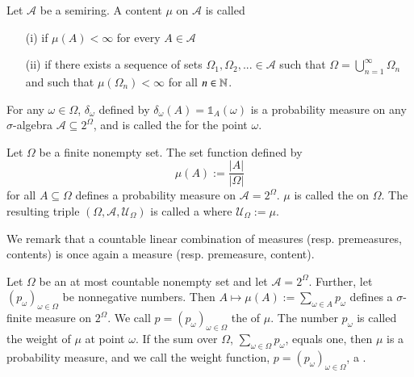 \documentclass[12pt, a4paper, oneside, openright, titlepage]{book}
\begin{document}
\begin{defn}
    Let $\mathcal{A}$ be a semiring. A content $\mu$ on $\mathcal{A}$ is called \begin{itemize}
        \item[(i)]  if $\mu(A) < \infty$ for every $A \in \mathcal{A}$
        \item[(ii)]  if there exists a sequence of sets $\Omega_1,\Omega_2,... \in \mathcal{A}$ such that $\Omega = \bigcup_{n=1}^{\infty}\Omega_n$ and such that $\mu(\Omega_n) < \infty$ for all $n \in \mathbb N$.
    \end{itemize}
\end{defn}

\begin{defn}
    For any $\omega \in \Omega$, $\delta_{\omega}$ defined by $\delta_{\omega}(A) = \mathbb{1}_A(\omega)$ is a probability measure on any $\sigma$-algebra $\mathcal{A} \subseteq 2^{\Omega}$, and is called the  for the point $\omega$.
\end{defn}

\begin{defn}
    Let $\Omega$ be a finite nonempty set. The set function defined by \begin{equation*}
        \mu(A) := \frac{|A|}{|\Omega|}
    \end{equation*}
    for all $A \subseteq \Omega$ defines a probability measure on $\mathcal{A} = 2^{\Omega}$. $\mu$ is called the  on $\Omega$. The resulting triple $(\Omega,\mathcal{A},\mathcal{U}_{\Omega})$ is called a  where $\mathcal{U}_{\Omega} := \mu$.
\end{defn}

We remark that a countable linear combination of measures (resp. premeasures, contents) is once again a measure (resp. premeasure, content). 

\begin{defn}
    Let $\Omega$ be an at most countable nonempty set and let $\mathcal{A} = 2^{\Omega}$. Further, let $(p_{\omega})_{\omega \in \Omega}$ be nonnegative numbers. Then $A\mapsto \mu(A) := \sum_{\omega \in A}p_{\omega}$ defines a $\sigma$-finite measure on $2^{\Omega}$. We call $p = (p_{\omega})_{\omega \in \Omega}$ the  of $\mu$. The number $p_{\omega}$ is called the weight of $\mu$ at point $\omega$. If the sum over $\Omega$, $\sum_{\omega \in \Omega}p_{\omega}$, equals one, then $\mu$ is a probability measure, and we call the weight function, $p = (p_{\omega})_{\omega \in \Omega}$, a .
\end{defn}
\end{document}
